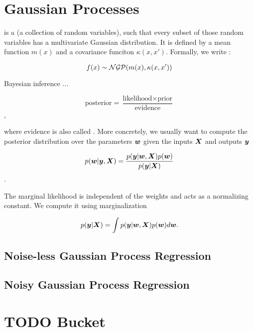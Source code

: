 
\chapter{Gaussian Processes}

 is a  (a collection of random variables), such that every subset of those random variables has a multivariate Gaussian distribution. It is defined by a mean function $m(x)$ and a covariance funciton $\kappa(x, x')$. Formally, we write :

\begin{equation}
f(x) \sim {\mathcal{N}} {\mathcal{G}} {\mathcal{P}} (m(x), \kappa(x, x'))
\end{equation} 

Bayesian inference ...

\begin{equation}
    \text{posterior} = \frac{\text{likelihood} \times \text{prior}}{\text{evidence}}
\end{equation},

where evidence is also called . More concretely, we usually want to compute the posterior distribution over the parameters ${\bm{w}}$ given the inputs ${\bm{X}}$ and outputs ${\bm{y}}$

\begin{equation}
    p({\bm{w}} | {\bm{y}}, {\bm{X}}) = \frac{p({\bm{y}} | {\bm{w}}, {\bm{X}}) p({\bm{w}})}{p({\bm{y}} | {\bm{X}})}
\end{equation}.

The marginal likelihood is independent of the weights and acts as a normalizing constant. We compute it using marginalization

\begin{equation}
    p({\bm{y}} | {\bm{X}}) = \int p({\bm{y}} | {\bm{w}}, {\bm{X}}) p({\bm{w}}) d {\bm{w}}.
\end{equation}


\section{Noise-less Gaussian Process Regression}

\section{Noisy Gaussian Process Regression}



\chapter{TODO Bucket}


